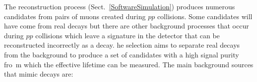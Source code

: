 The reconstruction process (Sect.~\ref{SoftwareSimulation}) produces numerous \bsmumu candidates from pairs of muons created during $pp$ collisions. Some candidates will have come from real \bsmumu decays but there are other background processes that occur during $pp$ collisions which leave a signature in the detector that can be reconstructed incorrectly as a \bsmumu decay. %
he selection aims to separate real \bsmumu decays from the background to produce a set of \bsmumu candidates with a high signal purity fro\
m which the \bs effective lifetime can be measured.
The main background sources that mimic \bsmumu decays are:

